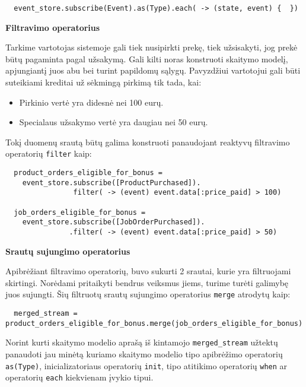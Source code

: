 \begin{lstlisting}
  event_store.subscribe(Event).as(Type).each( -> (state, event) {  })
\end{lstlisting}

\textbf{Filtravimo operatorius}

Tarkime vartotojas sistemoje gali tiek nusipirkti prekę, tiek užsisakyti, jog prekė būtų pagaminta pagal užsakymą. Gali kilti noras konstruoti skaitymo modelį, apjungiantį juos abu bei turint papildomų sąlygų. Pavyzdžiui vartotojui gali būti suteikiami kreditai už sėkmingą pirkimą tik tada, kai:

\begin{itemize}
  \item Pirkinio vertė yra didesnė nei 100 eurų.
  \item Specialaus užsakymo vertė yra daugiau nei 50 eurų.
\end{itemize}

Tokį duomenų srautą būtų galima konstruoti panaudojant reaktyvų filtravimo operatorių \lstinline|filter| kaip:

\begin{lstlisting}
  product_orders_eligible_for_bonus =
    event_store.subscribe([ProductPurchased]).
                filter( -> (event) event.data[:price_paid] > 100)

  job_orders_eligible_for_bonus =
    event_store.subscribe([JobOrderPurchased]).
               .filter( -> (event) event.data[:price_paid] > 50)
\end{lstlisting}

\textbf{Srautų sujungimo operatorius}

Apibrėžiant filtravimo operatorių, buvo sukurti 2 srautai, kurie yra filtruojami skirtingi. Norėdami pritaikyti bendrus veiksmus jiems, turime turėti galimybę juos sujungti. Šių filtruotų srautų sujungimo operatorius \lstinline|merge| atrodytų kaip:

\begin{lstlisting}
  merged_stream = product_orders_eligible_for_bonus.merge(job_orders_eligible_for_bonus)
\end{lstlisting}

Norint kurti skaitymo modelio aprašą iš kintamojo \lstinline|merged_stream| užtektų panaudoti jau minėtą kuriamo skaitymo modelio tipo apibrėžimo operatorių \lstinline|as(Type)|, inicializatoriaus operatorių \lstinline|init|, tipo atitikimo operatorių \lstinline|when| ar operatorių \lstinline|each| kiekvienam įvykio tipui.

